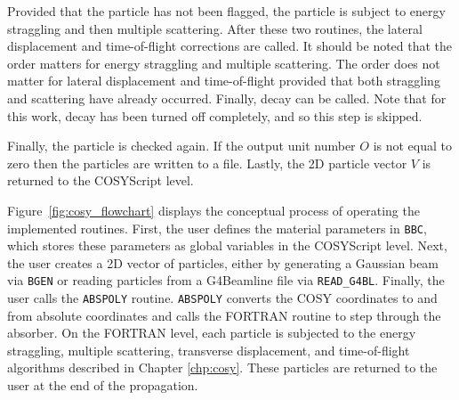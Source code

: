 Provided that the particle has not been flagged, the particle is subject to energy straggling and then multiple scattering. After these two routines, the lateral displacement and time-of-flight corrections are called. It should be noted that the order matters for energy straggling and multiple scattering. The order does not matter for lateral displacement and time-of-flight provided that both straggling and scattering have already occurred. Finally, decay can be called. Note that for this work, decay has been turned off completely, and so this step is skipped.

Finally, the particle is checked again. If the output unit number $O$ is not equal to zero then the particles are written to a file. Lastly, the 2D particle vector $V$ is returned to the COSYScript level.


Figure~\ref{fig:cosy_flowchart} displays the conceptual process of operating the implemented routines. First, the user defines the material parameters in \texttt{BBC}, which stores these parameters as global variables in the COSYScript level. Next, the user creates a 2D vector of particles, either by generating a Gaussian beam via \texttt{BGEN} or reading particles from a G4Beamline file via \verb|READ_G4BL|. Finally, the user calls the \texttt{ABSPOLY} routine. \texttt{ABSPOLY} converts the COSY coordinates to and from absolute coordinates and calls the FORTRAN routine to step through the absorber. On the FORTRAN level, each particle is subjected to the energy straggling, multiple scattering, transverse displacement, and time-of-flight algorithms described in Chapter \ref{chp:cosy}. These particles are returned to the user at the end of the propagation.